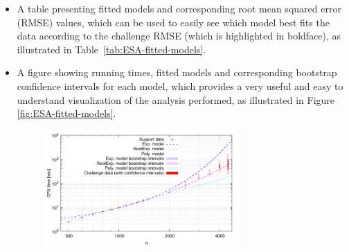 \documentclass[aic]{iosart2x}
\begin{document}
\begin{itemize}
\item A table presenting fitted models and corresponding root mean squared error (RMSE) values, which can be used to easily see which model best fits the data according to the challenge RMSE (which is highlighted in boldface), as illustrated
in Table~\ref{tab:ESA-fitted-models}.
\begin{table}[t]
\caption{Fitted models example} \label{tab:ESA-fitted-models}
\begin{centering}
\medskip{}
\par
\end{centering}
\end{table}

\item A figure showing running times, fitted models and corresponding bootstrap confidence intervals for each model, which provides a very useful and easy to understand visualization of the analysis performed, as illustrated in Figure \ref{fig:ESA-fitted-models}.
\begin{figure}[t]
\noindent \begin{centering}
\includegraphics[width=0.7\textwidth]{EAX_fittedModels} \vspace{-5mm}

\par\end{centering}


\end{figure}
\end{itemize}
\end{document}
